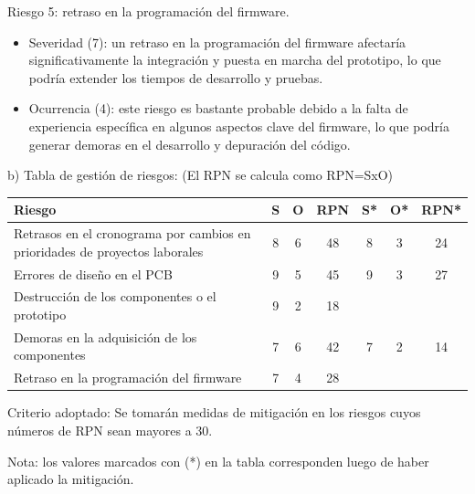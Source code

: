 \documentclass[
11pt, %
]{charter}
\begin{document}
Riesgo 5: retraso en la programación del firmware.
\begin{itemize}
	\item Severidad (7): un retraso en la programación del firmware afectaría significativamente la integración y puesta en marcha del prototipo, lo que podría extender los tiempos de desarrollo y pruebas.\\
	\item Ocurrencia (4):  este riesgo es bastante probable debido a la falta de experiencia específica en algunos aspectos clave del firmware, lo que podría generar demoras en el desarrollo y depuración del código.\\
\end{itemize}   

b) Tabla de gestión de riesgos:      (El RPN se calcula como RPN=SxO)

\begin{table}[htpb]
\centering
\begin{tabularx}{\linewidth}{@{}|X|c|c|c|c|c|c|@{}}
\hline
\rowcolor[HTML]{C0C0C0} 
Riesgo &                                                                                                                         S & O & RPN & S* & O* & RPN* \\ \hline
Retrasos en el cronograma por cambios en prioridades de proyectos laborales &   	8&  6 &     48&    8&   3&     24  \\ \hline
Errores de diseño en el PCB&   				 					9&   5&     45&    9&   3&     27  \\ \hline
Destrucción de los componentes o el prototipo&  						9&   2&     18&      &     &           \\ \hline
Demoras en la adquisición de los componentes&   						7&   6&     42&    7&   2&     14  \\ \hline
Retraso en la programación del firmware &  		 					7&   4&    28&       &     &           \\ \hline
\end{tabularx}%
\end{table}

Criterio adoptado: Se tomarán medidas de mitigación en los riesgos cuyos números de RPN sean mayores a 30.

Nota: los valores marcados con (*) en la tabla corresponden luego de haber aplicado la mitigación.
\end{document}
